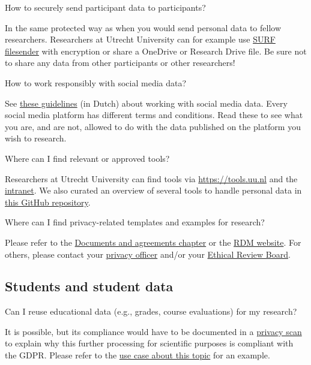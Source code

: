 \documentclass[
]{book}
\begin{document}
How to securely send participant data to participants?

In the same protected way as when you would send personal data to fellow researchers. Researchers at Utrecht University can for example use \href{https://filesender.surf.nl/}{SURF filesender} with encryption or share a OneDrive or Research Drive file. Be sure not to share any data from other participants or other researchers!

How to work responsibly with social media data?

See \href{https://doi.org/10.33540/1874/406645}{these guidelines} (in Dutch) about working with social media data. Every social media platform has different terms and conditions. Read these to see what you are, and are not, allowed to do with the data published on the platform you wish to research.

Where can I find relevant or approved tools?

Researchers at Utrecht University can find tools via \url{https://tools.uu.nl} and the \href{https://intranet.uu.nl/en/knowledgebase/software-at-work-teaching-rooms-and-home}{intranet}. We also curated an overview of several tools to handle personal data in \href{https://github.com/UtrechtUniversity/privacy-engineering-tools/}{this GitHub repository}.

Where can I find privacy-related templates and examples for research?

Please refer to the \protect\hyperlink{legal-documents}{Documents and agreements chapter} or the \href{https://www.uu.nl/rdm}{RDM website}. For others, please contact your \href{https://intranet.uu.nl/en/knowledgebase/privacyofficers}{privacy officer} and/or your \href{https://intranet.uu.nl/en/knowledgebase/ethics-assessment}{Ethical Review Board}.

\hypertarget{students}{%
\subsection{Students and student data}\label{students}}

Can I reuse educational data (e.g., grades, course evaluations) for my research?

It is possible, but its compliance would have to be documented in a \protect\hyperlink{privacy-scan}{privacy scan} to explain why this further processing for scientific purposes is compliant with the GDPR. Please refer to the \protect\hyperlink{reuse-education-data}{use case about this topic} for an example.
\end{document}
